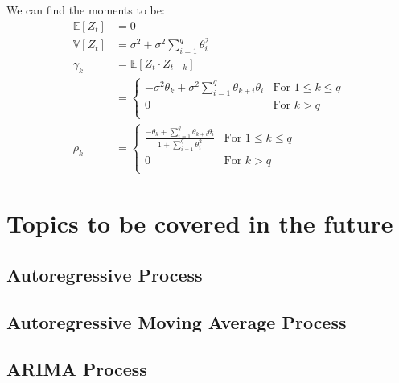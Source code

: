 We can find the moments to be:
\begin{equation*}
    \begin{aligned}
       \mathbb{E}[Z_t] & = 0 \\
       \mathbb{V}[Z_t] & = \sigma^2 + \sigma^2 \sum_{i=1}^{q} \theta^2_i \\
       \gamma_k &= \mathbb{E}[Z_t \cdot Z_{t-k}] \\
           &= \begin{cases}
               -\sigma^2\theta_k + \sigma^2 \sum_{i=1}^{q}
               \theta_{k+i}\theta_i &  \text{For $1 \le k \le q$} \\
               0 & \text{For $k > q$} \\
           \end{cases} \\
        \rho_k &= \begin{cases}
            \frac{
                -\theta_k + \sum_{i=1}^{q} \theta_{k+i}\theta_i
            }{
                1 + \sum_{i=1}^{q} \theta_i^2
            } &  \text{For $1 \le k \le q$} \\
               0 & \text{For $k > q$} \\
            \end{cases}
    \end{aligned}
\end{equation*}

\section{Topics to be covered in the future}
\subsection{Autoregressive Process}
\subsection{Autoregressive Moving Average Process}
\subsection{ARIMA Process}
